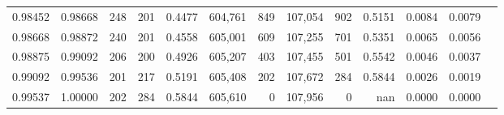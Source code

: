 \begin{tabular}{rrrrrrrrrrrrr}
0.98452 & 0.98668 &   248 & 201 &                                     0.4477 & 604,761 &     849 & 107,054 &     902 & 0.5151 & 0.0084 & 0.0079 \\
0.98668 & 0.98872 &   240 & 201 &                                     0.4558 & 605,001 &     609 & 107,255 &     701 & 0.5351 & 0.0065 & 0.0056 \\
0.98875 & 0.99092 &   206 & 200 &                                     0.4926 & 605,207 &     403 & 107,455 &     501 & 0.5542 & 0.0046 & 0.0037 \\
0.99092 & 0.99536 &   201 & 217 &                                     0.5191 & 605,408 &     202 & 107,672 &     284 & 0.5844 & 0.0026 & 0.0019 \\
0.99537 & 1.00000 &   202 & 284 &                                     0.5844 & 605,610 &       0 & 107,956 &       0 &    nan & 0.0000 & 0.0000 \\
\bottomrule
\end{tabular}
